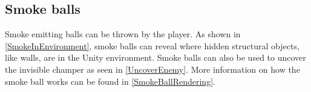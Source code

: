 
\subsection{Smoke balls}
Smoke emitting  balls can be thrown by the player. As shown in \cref{SmokeInEnvironment}, smoke balls can reveal where hidden structural objects, like walls, are in the Unity environment. Smoke balls can also be used to uncover the invisible champer as seen in \cref{UncoverEnemy}. More information on how the smoke ball works can be found in \cref{SmokeBallRendering}.


